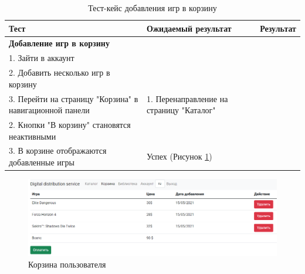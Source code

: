 \begin{table}[h]
	\caption{Тест-кейс добавления игр в корзину}
	\label{table:testing:func:test4}
	\centering
	  \begin{tabular}{| >{\raggedright}m{} 
					  | >{\raggedright}m{} 
					  | >{\raggedright\arraybackslash}m{}|}
	  \hline Тест & Ожидаемый результат  & Результат \\
	  \hline \textbf{Добавление игр в корзину} \\ 1. Зайти в аккаунт \\ 2. Добавить несколько игр в корзину \\ 3. Перейти на страницу "Корзина" в навигационной панели & 1. Перенаправление на страницу "Каталог" \\ 2. Кнопки "В корзину" становятся неактивными \\ 3. В корзине отображаются добавленные игры & Успех (Рисунок \ref*{sec:testing:func:cart})\\
	  \hline
	  \end{tabular}
\end{table}

\begin{figure}[!h]
	\centering
	  \includegraphics[scale=0.4]{attachments/cart.png}  
	  \caption{ Корзина пользователя }
	  \label{sec:testing:func:cart}
\end{figure}

